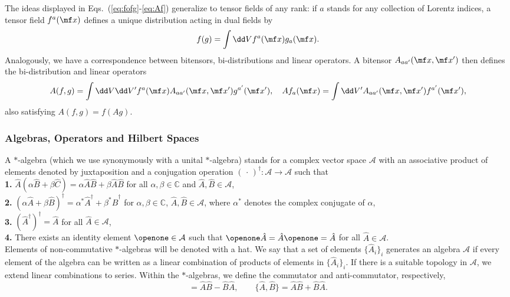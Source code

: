 The ideas displayed in Eqs.~(\ref{eq:fofg}-\ref{eq:Af}) generalize to tensor fields of any rank: if $a$ stands for any collection of Lorentz indices, a tensor field $f^a(\mf x)$ defines a unique distribution acting in dual fields by
\begin{equation}
    f(g) = \int \dd V f^a(\mf x) g_a(\mf x).
\end{equation}
Analogously, we have a correspondence between bitensors, bi-distributions and linear operators. A bitensor $A_{aa'}(\mf x, \mf x')$ then defines the bi-distribution and linear operators
\begin{equation}
    A(f,g) = \int \dd V \dd V' f^a(\mf x) A_{aa'}(\mf x,\mf x') g^{a'}(\mf x'), \quad Af_a(\mf x) = \int \dd V' A_{aa'}(\mf x, \mf x')f^{a'}(\mf x'),
\end{equation}
also satisfying $A(f,g) = f(Ag)$. 


\subsubsection*{Algebras, Operators and Hilbert Spaces}

A $\ast$-algebra (which we use synonymously with a unital $\ast$-algebra) stands for a complex vector space $\mathcal{A}$ with an associative product of elements denoted by juxtaposition and a conjugation operation ${(\,\cdot\,)}^\dagger:\mathcal{A}\to\mathcal{A}$ such that\\[2mm]
\noindent \textbf{1.} $\hat{A}(\alpha \hat{B} + \beta \hat{C}) = \alpha \hat{A}\hat{B} + \beta \hat{A}\hat{B}$ for all $\alpha,\beta\in \mathbb{C}$ and $\hat{A},\hat{B}\in \mathcal{A}$,\\[2mm]
\noindent \textbf{2.} $(\alpha\hat{A} + \beta \hat{B})^\dagger = \alpha^*\hat{A}^\dagger + \beta^*\hat{B}^\dagger$ for $\alpha,\beta\in \mathbb{C}$, $\hat{A},\hat{B}\in \mathcal{A}$, where $\alpha^*$ denotes the complex conjugate of $\alpha$,\\[2mm]
\noindent \textbf{3.} $(\hat{A}^\dagger)^\dagger = \hat{A}$ for all $\hat{A}\in \mathcal{A}$,\\[2mm]
\noindent \textbf{4.} There exists an identity element $\openone\in \mathcal{A}$ such that $\openone \hat{A} = \hat{A} \openone = \hat{A}$ for all $\hat{A}\in \mathcal{A}$. \\[2mm]
\noindent Elements of non-commutative $\ast$-algebras will be denoted with a hat.  We say that a set of elements $\{\hat{A}_i\}_i$ generates an algebra $\mathcal{A}$ if every element of the algebra can be written as a linear combination of products of elements in $\{\hat{A}_i\}_i$. If there is a suitable topology in $\mathcal{A}$, we extend linear combinations to series. Within the $\ast$-algebras, we define the commutator and anti-commutator, respectively,
\begin{equation}
    [\hat{A},\hat{B}] = \hat{A} \hat{B} - \hat{B}\hat{A}, \quad \quad 
    \{\hat{A},\hat{B}\} = \hat{A} \hat{B} + \hat{B}\hat{A}.
\end{equation}

